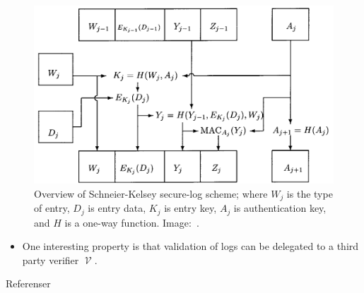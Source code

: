 \documentclass{beamer}
\DeclareMathOperator{\V}{\mathcal{V}}
\begin{document}
\begin{frame}{\insertsubsectionhead}
  \begin{figure}
    \includegraphics[height=0.7\textheight]{seclog.png}
    \caption{%
      Overview of Schneier-Kelsey secure-log scheme; where \(W_j\) is the type 
      of entry, \(D_j\) is entry data, \(K_j\) is entry key, \(A_j\) is 
      authentication key, and \(H\) is a one-way function.
      Image:~\cite{schneier1999secure}.
    }
  \end{figure}
\end{frame}

\begin{frame}{\insertsubsectionhead}
  \begin{itemize}
    \item One interesting property is that validation of logs can be delegated 
      to a third party verifier \(\V\).
  \end{itemize}
\end{frame}



\begin{frame}{Referenser}
  \small
  \printbibliography{}
\end{frame}
\end{document}
